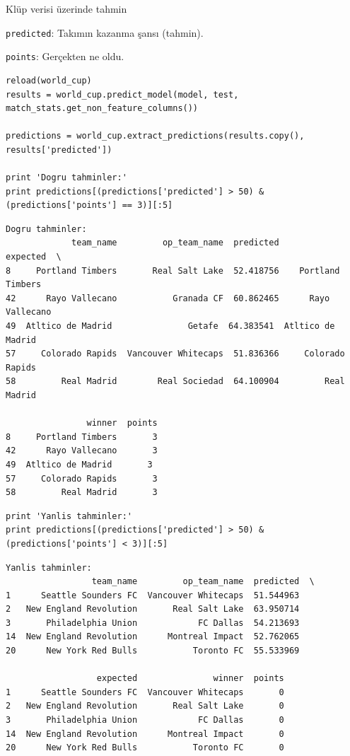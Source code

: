 \documentclass[12pt,fleqn]{article}\usepackage{../../common}
\begin{document}
Klüp verisi üzerinde tahmin

\verb!predicted!: Takımın kazanma şansı (tahmin).

\verb!points!: Gerçekten ne oldu.

\begin{verbatim}
reload(world_cup)
results = world_cup.predict_model(model, test, match_stats.get_non_feature_columns())

predictions = world_cup.extract_predictions(results.copy(), results['predicted'])

print 'Dogru tahminler:'
print predictions[(predictions['predicted'] > 50) & (predictions['points'] == 3)][:5]
\end{verbatim}

\begin{verbatim}
Dogru tahminler:
             team_name         op_team_name  predicted            expected  \
8     Portland Timbers       Real Salt Lake  52.418756    Portland Timbers   
42      Rayo Vallecano           Granada CF  60.862465      Rayo Vallecano   
49  Atltico de Madrid               Getafe  64.383541  Atltico de Madrid   
57     Colorado Rapids  Vancouver Whitecaps  51.836366     Colorado Rapids   
58         Real Madrid        Real Sociedad  64.100904         Real Madrid   

                winner  points  
8     Portland Timbers       3  
42      Rayo Vallecano       3  
49  Atltico de Madrid       3  
57     Colorado Rapids       3  
58         Real Madrid       3  
\end{verbatim}

\begin{verbatim}
print 'Yanlis tahminler:'
print predictions[(predictions['predicted'] > 50) & (predictions['points'] < 3)][:5]
\end{verbatim}

\begin{verbatim}
Yanlis tahminler:
                 team_name         op_team_name  predicted  \
1      Seattle Sounders FC  Vancouver Whitecaps  51.544963   
2   New England Revolution       Real Salt Lake  63.950714   
3       Philadelphia Union            FC Dallas  54.213693   
14  New England Revolution      Montreal Impact  52.762065   
20      New York Red Bulls           Toronto FC  55.533969   

                  expected               winner  points  
1      Seattle Sounders FC  Vancouver Whitecaps       0  
2   New England Revolution       Real Salt Lake       0  
3       Philadelphia Union            FC Dallas       0  
14  New England Revolution      Montreal Impact       0  
20      New York Red Bulls           Toronto FC       0  
\end{verbatim}
\end{document}
